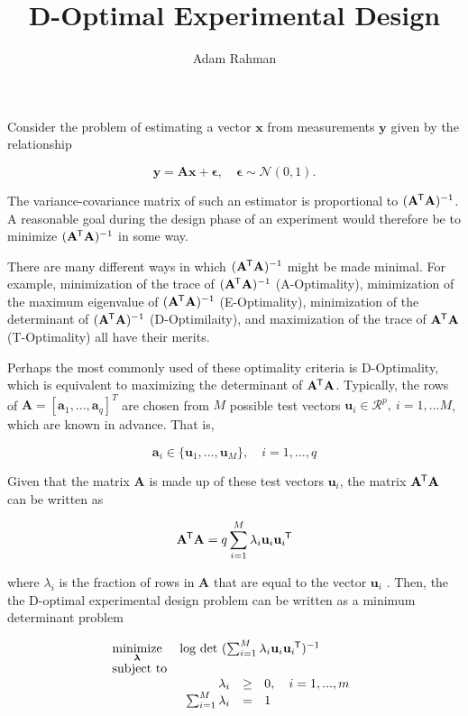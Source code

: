 \documentclass{article}
\author{Adam Rahman}
\title{D-Optimal Experimental Design}
\newcommand{\ve}[1]{\mathbf{#1}}           %
\newcommand{\sv}[1]{\boldsymbol{#1}}   %
\newcommand{\m}[1]{\mathbf{#1}}               %
\newcommand{\tr}[1]{{#1}^{\mkern-1.5mu\mathsf{T}}}              %
\begin{document}
\maketitle

Consider the problem of estimating a vector $\ve{x}$ from measurements $\ve{y}$ given by the relationship

\[
\ve{y} = \m{A}\ve{x} + \sv{\epsilon}, \quad \sv{\epsilon} \sim \mathcal{N}(0,1). 
\]

The variance-covariance matrix of such an estimator is proportional to $(\tr{\m{A}}\ve{A})^{-1}$. A reasonable goal during the design phase of an experiment would therefore be to minimize $(\tr{\m{A}}\ve{A})^{-1}$ in some way. 

There are many different ways in which $(\tr{\m{A}}\ve{A})^{-1}$ might be made minimal. For example, minimization of the trace of $(\tr{\m{A}}\ve{A})^{-1}$ (A-Optimality), minimization of the maximum eigenvalue of $(\tr{\m{A}}\ve{A})^{-1}$ (E-Optimality), minimization of the determinant of $(\tr{\m{A}}\ve{A})^{-1}$ (D-Optimilaity), and maximization of the trace of $\tr{\m{A}}\ve{A}$ (T-Optimality) all have their merits. 

Perhaps the most commonly used of these optimality criteria is D-Optimality, which is equivalent to maximizing the determinant of $\tr{\m{A}}\ve{A}$. Typically, the rows of $\m{A} = [\ve{a}_{1},...,\ve{a}_{q}]^{T}$ are chosen from $M$ possible test vectors $\ve{u}_{i} \in \mathcal{R}^{p}, ~ i=1,...M$, which are known in advance. That is,

\[
\ve{a}_{i} \in \{\ve{u}_{1},...,\ve{u}_{M}\}, \quad i = 1,...,q
\]

Given that the matrix $\m{A}$ is made up of these test vectors $\ve{u}_{i}$, the matrix $\tr{\m{A}}\ve{A}$ can be written as 

\begin{equation}
\tr{\m{A}}\ve{A} = q \sum_{i=1}^{M}\lambda_{i}\ve{u}_{i}\tr{\ve{u}_{i}}
\label{eq:dopt}
\end{equation}

\noindent where $\lambda_{i}$ is the fraction of rows in $\m{A}$ that are equal to the vector $\ve{u}_{i}$ \cite{vandenberghe1998determinant}.  Then, the the D-optimal experimental design problem can be written as a minimum determinant problem \cite{vandenberghe1998determinant}

\[
\begin{array}{ll}
\underset{\sv{\lambda}}{\text{minimize}} & \text{log}~\text{det}~(\sum_{i=1}^{M}\lambda_{i}\ve{u}_{i}\tr{\ve{u}_{i}})^{-1} \\
\text{subject to} & \\
& 
\begin{array}{rl}
\lambda_{i} &\geq~~0, \quad i = 1,...,m \\
\sum_{i=1}^{M}\lambda_{i} &=~~1
\end{array}
\end{array}
\]
\end{document}
